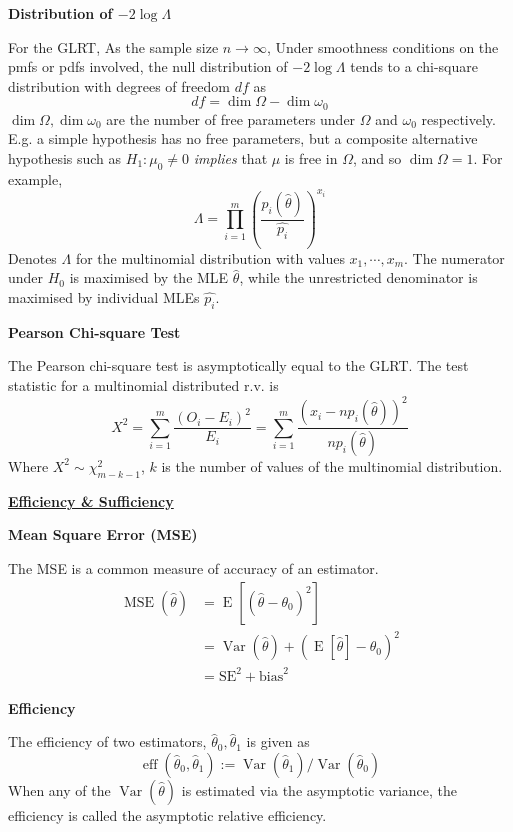 \documentclass[a4paper]{article}
\newcommand{\heading}[1]{{\small\underline{\textbf{#1}}}\smallskip}
\newcommand{\subheading}[1]{{\scriptsize\textbf{#1}}}
\renewenvironment{section}[1]
  {
    \subheading{#1}\smallskip

  }{
    \medskip
  }
\newcommand{\expectation}[1]{\operatorname{E}[#1]}
\DeclareMathOperator{\Var}{Var}
\DeclareMathOperator{\MSE}{MSE}
\DeclareMathOperator{\eff}{eff}
\begin{document}
\begin{multicols*}{4}
\begin{section}{Distribution of $-2\log \Lambda$}
  For the GLRT, As the sample size $n \rightarrow \infty$, Under smoothness
  conditions on the pmfs or pdfs involved, the null distribution of $-2\log
  \Lambda$ tends to a chi-square distribution with degrees of freedom $df$ as
  $$df = \dim \Omega - \dim \omega_0$$
  $\dim \Omega, \dim \omega_0$ are the number of free parameters under $\Omega$
  and $\omega_0$ respectively. E.g. a simple hypothesis has no free parameters,
  but a composite alternative hypothesis such as $H_1: \mu_0 \neq 0$
  \textit{implies} that $\mu$ is free in $\Omega$, and so $\dim \Omega = 1$. For
  example,
  $$\Lambda = \prod^m_{i=1} \left(
    \frac{p_i(\hat{\theta})}{\hat{p_i}}
  \right )^{x_i}$$
  Denotes $\Lambda$ for the multinomial distribution with values $x_1, \cdots,
  x_m$. The numerator under $H_0$ is maximised by the MLE $\hat{\theta}$, while
  the unrestricted denominator is maximised by individual MLEs $\hat{p_i}$.
\end{section}

\begin{section}{Pearson Chi-square Test}
  The Pearson chi-square test is asymptotically equal to the GLRT. The test
  statistic for a multinomial distributed r.v. is
  $$X^2 = \sum^m_{i=1}\frac{(O_i - E_i)^2}{E_i}
    = \sum^m_{i=1} \frac{(x_i - np_i(\hat{\theta}))^2}{np_i(\hat{\theta})}$$
  Where $X^2 \sim \chi^2_{m-k-1}$, $k$ is the number of values of the
  multinomial distribution.
\end{section}

\heading{Efficiency \& Sufficiency}

\begin{section}{Mean Square Error (MSE)}
  The MSE is a common measure of accuracy of an estimator.
  \begin{align*}
    \MSE(\hat{\theta}) &= \expectation{(\hat{\theta}-\theta_0)^2} \\
                       &= \Var(\hat{\theta}) +
                          (\expectation{\hat{\theta}} - \theta_0)^2 \\
                       &= \text{SE}^2 + \text{bias}^2
  \end{align*}
\end{section}

\begin{section}{Efficiency}
  The efficiency of two estimators, $\hat{\theta}_0, \hat{\theta}_1$ is given as
  $$\eff(\hat{\theta}_0, \hat{\theta}_1) :=
    \Var(\hat{\theta}_1)/\Var(\hat{\theta}_0)$$
  When any of the $\Var(\hat{\theta})$ is estimated via the asymptotic variance,
  the efficiency is called the asymptotic relative efficiency.
\end{section}


\end{multicols*}
\end{document}
